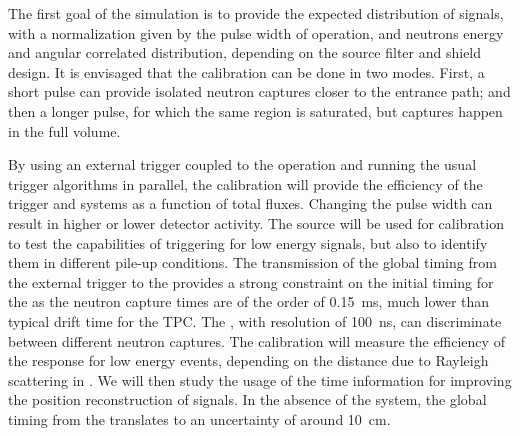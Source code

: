 
The first goal of the simulation is to provide the expected distribution of signals, with a normalization given by the pulse width of  operation, and neutrons energy and angular correlated distribution, depending on the source filter and shield design.
It is envisaged that the calibration can be done in two modes. First, a short  pulse can provide isolated neutron captures closer to the entrance path; and then a longer 
pulse, for which the same region is saturated, but 
captures 
happen in the full volume.

By using an external trigger coupled to the  operation and running the usual trigger algorithms in parallel, the calibration will provide the efficiency of the trigger and  systems as a function of total fluxes. Changing the pulse width can result in 
higher or lower detector activity. The source will be used for  calibration to test
the capabilities of triggering for low energy signals, but also 
to identify them in different pile-up conditions.
The transmission of the global timing from the external  trigger to the  provides a strong constraint on the initial timing for the 
as the neutron capture times are of the order of \SI{0.15}{\milli\s}, much lower than typical drift time 
for the TPC. The , with resolution of \SI{100}{\nano\s}, can discriminate between different neutron captures. The calibration will measure the efficiency of the  response for low energy events, depending on the distance due to Rayleigh scattering in \lar. We will then study the usage of the  time information for improving the position reconstruction of  signals. In the absence of the  system, the global timing from the  translates to an uncertainty of around \SI{10}{\cm}.

